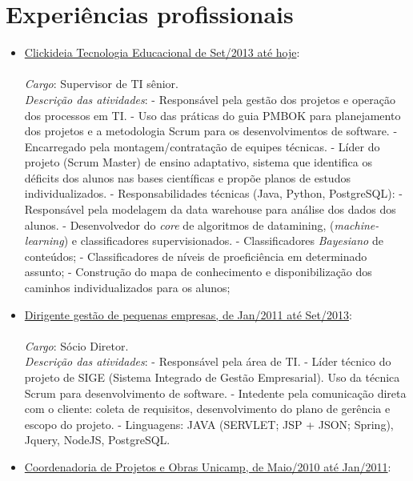 \documentclass[a4paper,11pt]{article}
\begin{document}
\section{Experiências profissionais}
\begin{itemize}

\item \underline{Clickideia Tecnologia Educacional de Set/2013 até hoje}:\\
{\small \\ 
  \emph{Cargo}: Supervisor de TI sênior.\\
  \emph{Descrição das atividades}: 
  \subitem - Responsável pela gestão dos projetos e operação dos processos em TI.
  \subitem - Uso das práticas do guia PMBOK para planejamento dos projetos e a metodologia Scrum para os desenvolvimentos de software.
  \subitem - Encarregado pela montagem/contratação de equipes técnicas.
  \subitem - Líder do projeto (Scrum Master) de ensino adaptativo, sistema que identifica os déficits dos alunos nas bases científicas e propõe planos de estudos individualizados.
  \subitem - Responsabilidades técnicas (Java, Python, PostgreSQL):
  \subsubitem - Responsável pela modelagem da data warehouse para análise dos dados dos alunos.
  \subsubitem - Desenvolvedor do \textit{core} de algoritmos de datamining, (\textit{machine-learning}) e classificadores supervisionados.
  \subsubitem - Classificadores \textit{Bayesiano} de conteúdos;
  \subsubitem - Classificadores de níveis de proeficiência em determinado assunto;
  \subsubitem - Construção do mapa de conhecimento e disponibilização dos caminhos individualizados para os alunos;
}
\item \underline{Dirigente gestão de pequenas empresas, de Jan/2011 até Set/2013}: \\
{\small \\
  \emph{Cargo}: Sócio Diretor.\\
  \emph{Descrição das atividades}: 
 \subitem - Responsável pela área de TI.
 \subitem - Líder técnico do projeto de SIGE (Sistema Integrado de Gestão Empresarial). Uso da técnica Scrum para desenvolvimento de software.
 \subitem - Intedente pela comunicação direta com o cliente: coleta de requisitos, desenvolvimento do plano de gerência e escopo do projeto.
 \subitem - Linguagens: JAVA (SERVLET; JSP + JSON; Spring), Jquery, NodeJS, PostgreSQL.\\
}
\item \underline{Coordenadoria de Projetos e Obras Unicamp, de Maio/2010 até Jan/2011}:\\

\end{itemize}
\end{document}
